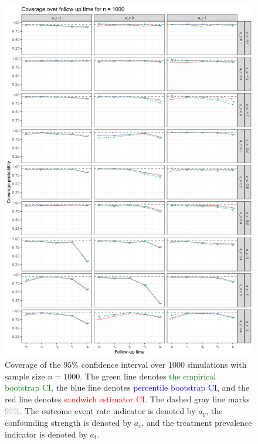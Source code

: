 \documentclass[pdflatex,sn-vancouver-ay]{sn-jnl}%
\theoremstyle{thmstyleone}%
\theoremstyle{thmstyletwo}%
\theoremstyle{thmstylethree}%
\begin{document}
\begin{appendices}
\begin{figure}[H]
\centering
\includegraphics[height=0.95\textheight]{plots/plots_coverage1000.png}
\caption{Coverage of the $95\%$ confidence interval over $1000$ simulations with sample size $n = 1000$. The green line denotes \textcolor{green}{the empirical bootstrap CI}, the blue line denotes \textcolor{blue}{percentile bootstrap CI}, and the red line denotes \textcolor{red}{sandwich estimator CI}. The dashed gray line marks \textcolor{darkgray}{$95\%$}. The outcome event rate indicator is denoted by $a_y$, the confounding strength is denoted by $a_c$, and the treatment prevalence indicator is denoted by $a_t$.}\label{plt:coverage1000}
\end{figure}

\newpage


\end{appendices}
\end{document}
